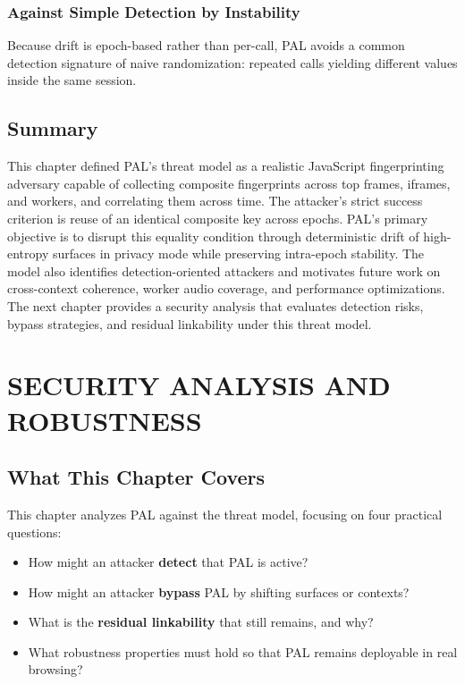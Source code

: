 \documentclass[11pt]{report}
\begin{document}
\subsection{Against Simple Detection by Instability}

Because drift is epoch-based rather than per-call, PAL avoids a common detection signature of naive randomization: repeated calls yielding different values inside the same session.

\section{Summary}

This chapter defined PAL’s threat model as a realistic JavaScript fingerprinting adversary capable of collecting composite fingerprints across top frames, iframes, and workers, and correlating them across time. The attacker’s strict success criterion is reuse of an identical composite key across epochs. PAL’s primary objective is to disrupt this equality condition through deterministic drift of high-entropy surfaces in privacy mode while preserving intra-epoch stability. The model also identifies detection-oriented attackers and motivates future work on cross-context coherence, worker audio coverage, and performance optimizations. The next chapter provides a security analysis that evaluates detection risks, bypass strategies, and residual linkability under this threat model.









\chapter{SECURITY ANALYSIS AND ROBUSTNESS}

\section{What This Chapter Covers}

This chapter analyzes PAL against the threat model, focusing on four practical questions:

\begin{itemize}
    \item How might an attacker \textbf{detect} that PAL is active?
    \item How might an attacker \textbf{bypass} PAL by shifting surfaces or contexts?
    \item What is the \textbf{residual linkability} that still remains, and why?
    \item What robustness properties must hold so that PAL remains deployable in real browsing?
\end{itemize}
\end{document}
